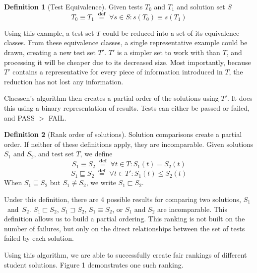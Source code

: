 \documentclass[11pt,twoside]{article}
\newcommand\defined{\mathrel{\;\stackrel{\scriptscriptstyle\mathbf{def}}{=}\;}}
\theoremstyle{definition}
\newtheorem{defn}{Definition}
\begin{document}
\begin{defn}[Test Equivalence]
Given tests $T_0$ and $T_1$ and solution set $S$
$$ T_0 \equiv T_1 \defined \forall s \in S : s(T_0) \equiv s(T_1) $$
\end{defn}


Using this example, a test set $T$ could be reduced into a set of its equivalence classes. From these equivalence classes, a single representative example could be drawn, creating a new test set $T'$. $T'$ is a simpler set to work with than $T$, and processing it will be cheaper due to its decreased size. Most importantly, because $T'$ contains a representative for every piece of information introduced in $T$, the reduction has not lost any information.


Claessen's algorithm then creates a partial order of the solutions using $T'$. It does this using a binary representation of results. Tests can either be passed or failed, and PASS $>$ FAIL.

\begin{defn}[Rank order of solutions]
Solution comparisons create a partial order. If neither of these definitions apply, they are incomparable.
Given solutions $S_1$ and $S_2$, and test set $T$, we define
$$S_1 \equiv S_2 \defined \forall t \in T : S_1(t) = S_2(t)$$
$$S_1 \sqsubseteq S_2 \defined \forall t \in T' : S_1(t) \leq S_2(t)$$
When $S_1 \sqsubseteq S_2$ but $S_1 \not\equiv S_2$, we write
$S_1 \sqsubset S_2$.
\end{defn}
Under this definition, there are 4 possible results for comparing two solutions, $S_1$~and~$S_2$. 
$S_1 \sqsubset S_2$, $S_1 \sqsupset S_2$, $S_1 \equiv S_2$, or $S_1$ and $S_2$  are incomparable. This definition allows us to build a partial ordering. This ranking is not built on the number of failures, but only on the direct relationships between the set of tests failed by each solution.

Using this algorithm, we are able to successfully create fair rankings of different student solutions. Figure 1 demonstrates one such ranking.
\end{document}
